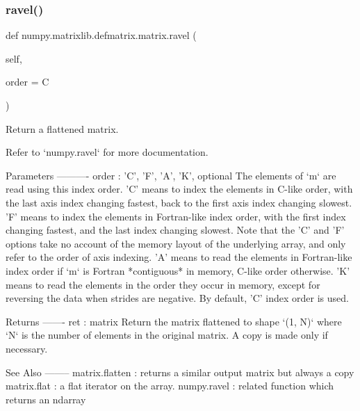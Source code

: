 \subsubsection{\texorpdfstring{ravel()}{ravel()}}
{\footnotesize\ttfamily def numpy.\+matrixlib.\+defmatrix.\+matrix.\+ravel (\begin{DoxyParamCaption}\item[{}]{self,  }\item[{}]{order = {\ttfamily \textquotesingle{}C\textquotesingle{}} }\end{DoxyParamCaption})}

\begin{DoxyVerb}Return a flattened matrix.

Refer to `numpy.ravel` for more documentation.

Parameters
----------
order : {'C', 'F', 'A', 'K'}, optional
    The elements of `m` are read using this index order. 'C' means to
    index the elements in C-like order, with the last axis index
    changing fastest, back to the first axis index changing slowest.
    'F' means to index the elements in Fortran-like index order, with
    the first index changing fastest, and the last index changing
    slowest. Note that the 'C' and 'F' options take no account of the
    memory layout of the underlying array, and only refer to the order
    of axis indexing.  'A' means to read the elements in Fortran-like
    index order if `m` is Fortran *contiguous* in memory, C-like order
    otherwise.  'K' means to read the elements in the order they occur
    in memory, except for reversing the data when strides are negative.
    By default, 'C' index order is used.

Returns
-------
ret : matrix
    Return the matrix flattened to shape `(1, N)` where `N`
    is the number of elements in the original matrix.
    A copy is made only if necessary.

See Also
--------
matrix.flatten : returns a similar output matrix but always a copy
matrix.flat : a flat iterator on the array.
numpy.ravel : related function which returns an ndarray\end{DoxyVerb}
 \mbox{\label{classnumpy_1_1matrixlib_1_1defmatrix_1_1matrix_a41337a248c9e72606e16b829380629a3}} 
